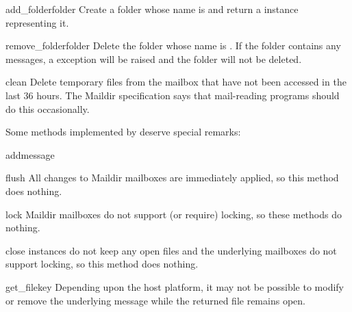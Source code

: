 \begin{methoddesc}{add_folder}{folder}
Create a folder whose name is  and return a 
instance representing it.
\end{methoddesc}

\begin{methoddesc}{remove_folder}{folder}
Delete the folder whose name is . If the folder contains any
messages, a  exception will be raised and the folder
will not be deleted.
\end{methoddesc}

\begin{methoddesc}{clean}{}
Delete temporary files from the mailbox that have not been accessed in the
last 36 hours. The Maildir specification says that mail-reading programs
should do this occasionally.
\end{methoddesc}

Some  methods implemented by  deserve special
remarks:

\begin{methoddesc}{add}{message}
\end{methoddesc}

\begin{methoddesc}{flush}{}
All changes to Maildir mailboxes are immediately applied, so this method does
nothing.
\end{methoddesc}

\begin{methoddesc}{lock}{}
Maildir mailboxes do not support (or require) locking, so these methods do
nothing. 
\end{methoddesc}

\begin{methoddesc}{close}{}
 instances do not keep any open files and the underlying
mailboxes do not support locking, so this method does nothing.
\end{methoddesc}

\begin{methoddesc}{get_file}{key}
Depending upon the host platform, it may not be possible to modify or remove
the underlying message while the returned file remains open.
\end{methoddesc}

